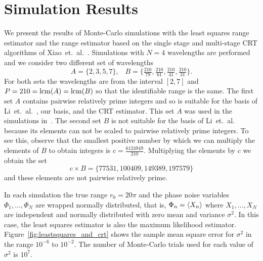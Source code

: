 \documentclass[10pt,twocolumn,twoside]{IEEEtran}
\begin{document}
  
\section{Simulation Results}\label{sec:simulation-results}


We present the results of Monte-Carlo simulations with the least squares range estimator and the range estimator based on the single stage and multi-stage CRT algorithms of Xiao~et.~al.~\cite{Xiao_multistage_crt_2014}.  Simulations with $N=4$ wavelengths are performed and we consider two different set of wavelengths
\[
A = \{2, 3, 5, 7\}, \;\;\; B = \{\tfrac{210}{79}, \tfrac{210}{61}, \tfrac{210}{41}, \tfrac{210}{31}\}.
\]
For both sets the wavelengths are from the interval $[2,7]$ and $P = 210 = \operatorname{lcm}(A) = \operatorname{lcm}(B)$ so that the identifiable range is the same.  The first set $A$ contains pairwise relatively prime integers and so is suitable for the basis of Li~et.~al.~\cite{Li_distance_est_wrapped_phase}, our basis, and the CRT estimator.  This set $A$ was used in the simulations in~\cite{Li_distance_est_wrapped_phase}.  The second set $B$ is not suitable for the basis of Li~et.~al.~\cite{Li_distance_est_wrapped_phase} because its elements can not be scaled to pairwise relatively prime integers.  To see this, observe that the smallest positive number by which we can multiply the elements of $B$ to obtain integers is $c = \tfrac{6124949}{210}$.  Multiplying the elements by $c$ we obtain the set
\[
c \times B = \{77531, 100409, 149389, 197579 \}
\]  
and these elements are not pairwise relatively prime.%

In each simulation the true range $r_0 = 20\pi$ and the phase noise variables $\Phi_1,\dots,\Phi_N$ are wrapped normally distributed, that is, $\Phi_n = \left\langle X_n \right\rangle$ where $X_1,\dots,X_N$ are independent and normally distributed with zero mean and variance $\sigma^2$.  In this case, the least squares estimator is also the maximum likelihood estimator.  Figure~\ref{fig:leastsquares_and_crt} shows the sample mean square error for $\sigma^2$ in the range $10^{-6}$ to $10^{-2}$.  The number of Monte-Carlo trials used for each value of $\sigma^2$ is $10^7$.  %
\end{document}

